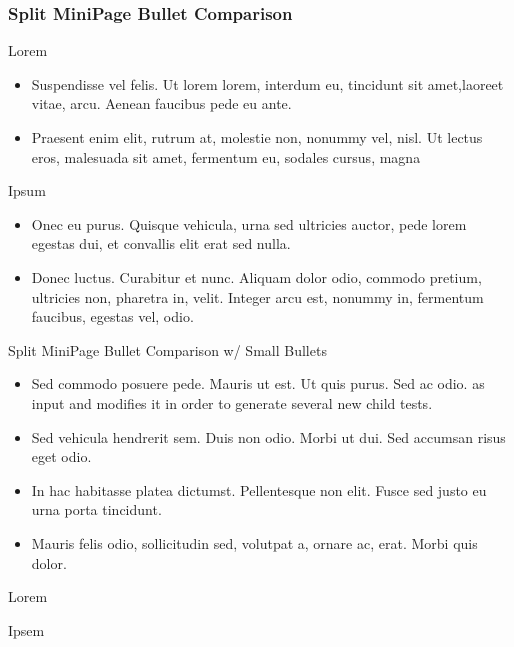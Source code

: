 \documentclass[xcolor=dvipsnames]{beamer} %
\begin{document}
\begin{frame}
\frametitle{Split MiniPage Bullet Comparison}
\small
\begin{minipage}[t]{.5\textwidth}
Lorem
\begin{itemize}
    \item Suspendisse vel felis. Ut lorem lorem, interdum eu, tincidunt sit     amet,laoreet vitae, arcu. Aenean faucibus pede eu ante.
    \item Praesent enim elit, rutrum at, molestie non, nonummy vel, nisl. Ut    lectus eros, malesuada sit amet, fermentum eu, sodales cursus, magna
\end{itemize}
\end{minipage}%
\begin{minipage}[t]{.5\textwidth}
Ipsum
\begin{itemize}
    \item Onec eu purus. Quisque
        vehicula, urna sed ultricies auctor, pede lorem egestas dui, et convallis elit erat sed nulla.
    \item Donec luctus. Curabitur et nunc. Aliquam dolor odio,
        commodo pretium, ultricies non, pharetra in, velit. Integer arcu est,
        nonummy in, fermentum faucibus, egestas vel, odio.
\end{itemize}
\end{minipage}%
\end{frame}

\begin{frame}{Split MiniPage Bullet Comparison w/ Small Bullets}
\begin{itemize}
    \tiny
    \item Sed commodo posuere pede. Mauris ut est. Ut quis purus. Sed ac odio.
as input and modifies it in order to generate several new child tests.
    \item Sed vehicula hendrerit sem. Duis non odio. Morbi ut dui. Sed accumsan risus eget odio.
    \item  In hac habitasse platea dictumst. Pellentesque non elit.
Fusce sed justo eu urna porta tincidunt.
    \item Mauris felis odio, sollicitudin sed,
volutpat a, ornare ac, erat. Morbi quis dolor. 
\end{itemize} 
\begin{minipage}[t]{.5\textwidth}
Lorem
\begin{center}
\end{center}
\end{minipage}%
\begin{minipage}[t]{.5\textwidth}
Ipsem
\begin{center}
\end{center}
\end{minipage}%
\end{frame}
\end{document}
